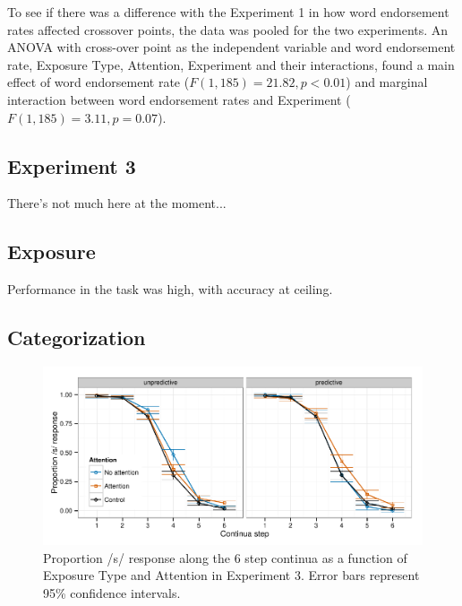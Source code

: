 \documentclass[11pt]{article}\usepackage[]{graphicx}\usepackage[]{color}
\begin{document}
To see if there was a difference with the Experiment 1 in how word endorsement rates affected crossover points, the data was pooled for the two experiments.  An ANOVA with cross-over point as the independent variable and word endorsement rate, Exposure Type, Attention, Experiment and their interactions, found a main effect of word endorsement rate ($F(1,185) = 21.82, p < 0.01$) and marginal interaction between word endorsement rates and Experiment ($F(1, 185) = 3.11, p = 0.07$).

\subsection{Experiment 3}

There's not much here at the moment...

\subsection{Exposure}

Performance in the task was high, with accuracy at ceiling.

\subsection{Categorization}



\begin{figure}[!ht]
\caption{Proportion /s/ response along the 6 step continua as a function of Exposure Type and Attention in Experiment 3.  Error bars represent 95\% confidence intervals.}
\label{fig:exp3categ}
\begin{center}
\includegraphics[width=\textwidth]{graphs/exp3_categresults}
\end{center}
\end{figure}



\end{document}

